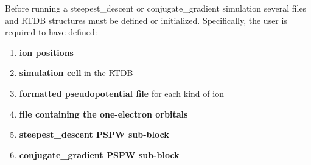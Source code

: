 Before running a steepest\_descent or conjugate\_gradient simulation several files and
RTDB structures must be defined or initialized.  Specifically, the user 
is required to have defined:
\begin{enumerate}
  \item {\bf ion positions} 
  \item {\bf simulation cell} in the RTDB 
  \item {\bf formatted pseudopotential file} for each kind of ion 
  \item {\bf file containing the one-electron orbitals} 
  \item {\bf steepest\_descent PSPW sub-block} 
  \item {\bf conjugate\_gradient PSPW sub-block}
\end{enumerate}

